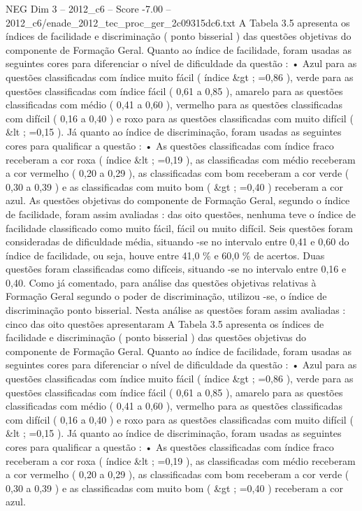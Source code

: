 \begin{textsample}{NEG Dim 3 – 2012\_c6 – Score -7.00 – 2012\_c6/enade\_2012\_tec\_proc\_ger\_2c09315dc6.txt}
A Tabela 3.5 apresenta os índices de facilidade e discriminação ( ponto bisserial ) das questões objetivas do componente de Formação Geral.
Quanto ao índice de facilidade, foram usadas as seguintes cores para diferenciar o nível de dificuldade da questão : • Azul para as questões classificadas com índice muito fácil ( índice \&gt ; =0,86 ), verde para as questões classificadas com índice fácil ( 0,61 a 0,85 ), amarelo para as questões classificadas com médio ( 0,41 a 0,60 ), vermelho para as questões classificadas com difícil ( 0,16 a 0,40 ) e roxo para as questões classificadas com muito difícil ( \&lt ; =0,15 ).
Já quanto ao índice de discriminação, foram usadas as seguintes cores para qualificar a questão : • As questões classificadas com índice fraco receberam a cor roxa ( índice \&lt ; =0,19 ), as classificadas com médio receberam a cor vermelho ( 0,20 a 0,29 ), as classificadas com bom receberam a cor verde ( 0,30 a 0,39 ) e as classificadas com muito bom ( \&gt ; =0,40 ) receberam a cor azul.
As questões objetivas do componente de Formação Geral, segundo o índice de facilidade, foram assim avaliadas : das oito questões, nenhuma teve o índice de facilidade classificado como muito fácil, fácil ou muito difícil.
Seis questões foram consideradas de dificuldade média, situando -se no intervalo entre 0,41 e 0,60 do índice de facilidade, ou seja, houve entre 41,0 \% e 60,0 \% de acertos.
Duas questões foram classificadas como difíceis, situando -se no intervalo entre 0,16 e 0,40.
Como já comentado, para análise das questões objetivas relativas à Formação Geral segundo o poder de discriminação, utilizou -se, o índice de discriminação ponto bisserial.
Nesta análise as questões foram assim avaliadas : cinco das oito questões apresentaram A Tabela 3.5 apresenta os índices de facilidade e discriminação ( ponto bisserial ) das questões objetivas do componente de Formação Geral.
Quanto ao índice de facilidade, foram usadas as seguintes cores para diferenciar o nível de dificuldade da questão : • Azul para as questões classificadas com índice muito fácil ( índice \&gt ; =0,86 ), verde para as questões classificadas com índice fácil ( 0,61 a 0,85 ), amarelo para as questões classificadas com médio ( 0,41 a 0,60 ), vermelho para as questões classificadas com difícil ( 0,16 a 0,40 ) e roxo para as questões classificadas com muito difícil ( \&lt ; =0,15 ).
Já quanto ao índice de discriminação, foram usadas as seguintes cores para qualificar a questão : • As questões classificadas com índice fraco receberam a cor roxa ( índice \&lt ; =0,19 ), as classificadas com médio receberam a cor vermelho ( 0,20 a 0,29 ), as classificadas com bom receberam a cor verde ( 0,30 a 0,39 ) e as classificadas com muito bom ( \&gt ; =0,40 ) receberam a cor azul.

\end{textsample}
